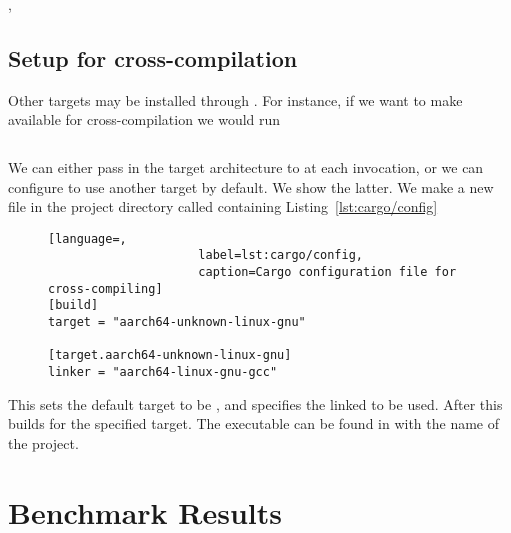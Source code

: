 \documentclass[b5paper]{report}
\begin{document}
\begin{appendices}
  \clearpage,
  \section{Setup for cross-compilation}
  Other targets may be installed through \rustup{}. For instance, if we want to
  make  available for cross-compilation we would run

  \begin{lstlisting}[language=Bash,numbers=none]
% rustup target add aarch64-unknown-linux-gnu
  \end{lstlisting}

  We can either pass in the target architecture to \cargo{} at each invocation,
  or we can configure \cargo{} to use another target by default. We show the latter.
  We make a new file in the project directory called 
  containing Listing~\ref{lst:cargo/config}

  \begin{figure}[ht]
  \begin{lstlisting}[language=,
                     label=lst:cargo/config,
                     caption=Cargo configuration file for cross-compiling]
[build]
target = "aarch64-unknown-linux-gnu"

[target.aarch64-unknown-linux-gnu]
linker = "aarch64-linux-gnu-gcc"
  \end{lstlisting}
  \end{figure}
  This sets the default target to be ,
  and specifies the linked to be used.
  After this  builds for the specified target.
  The executable can be found in 
  with the name of the project.


  \chapter{Benchmark Results\label{ch:benchmarks}}

\newcommand{\figuregrid}[1]{

  \rotatebox{90}{\hspace{-0.6cm}\footnotesize{\code{Queue::push}}}
  \foreach \scheme in {nothing, crossbeam, ebr, hp, hpspin} {%
    \begin{subfigure}{0.20\textwidth}
      \centering \footnotesize{\code{\scheme}}
      \texttt{[image: plots/\#1-s:\\scheme-b:queue\_push]}
    \end{subfigure}}

}
\end{appendices}
\end{document}
